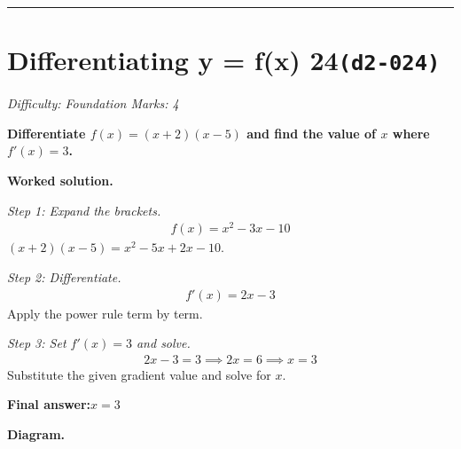 \documentclass[11pt]{article}
\newcommand{\question}[1]{\par\medskip\noindent\textbf{#1}\par}
\begin{document}
\medskip\hrule

\section*{Differentiating y = f(x) 24\quad\small\texttt{(d2-024)}}
\textit{Difficulty: Foundation \quad\textbar\quad Marks: 4}

\question{Differentiate \( f(x) = (x+2)(x-5) \) and find the value of \( x \) where \( f'(x) = 3 \).}

\textbf{Worked solution.}

\textit{Step 1: Expand the brackets.}
\[\begin{gathered}
f(x) = x^2 - 3x - 10
\end{gathered}\]
\( (x+2)(x-5) = x^2 - 5x + 2x - 10 \).

\textit{Step 2: Differentiate.}
\[\begin{gathered}
f'(x) = 2x - 3
\end{gathered}\]
Apply the power rule term by term.

\textit{Step 3: Set \( f'(x) = 3 \) and solve.}
\[\begin{gathered}
2x - 3 = 3 \implies 2x = 6 \implies x = 3
\end{gathered}\]
Substitute the given gradient value and solve for \( x \).

\begin{answerbox}
\textbf{Final answer:}\quad \(\displaystyle  x = 3 \)
\end{answerbox}
\textbf{Diagram.}
\end{document}
